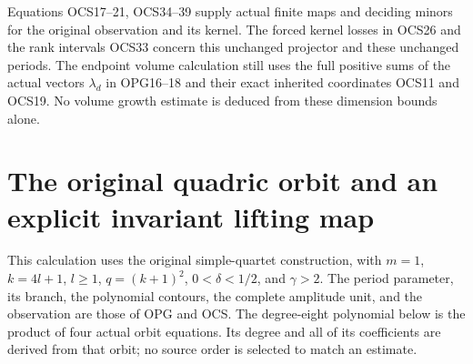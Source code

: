 \documentclass[11pt,a4paper]{article}
\begin{document}
Equations OCS17--21, OCS34--39 supply actual finite maps
and deciding minors for the original observation and its
kernel. The forced kernel losses in OCS26 and the rank
intervals OCS33 concern this unchanged projector and these
unchanged periods. The endpoint volume calculation still
uses the full positive sums of the actual vectors
$\lambda_d$ in OPG16--18 and their exact inherited
coordinates OCS11 and OCS19. No volume growth estimate
is deduced from these dimension bounds alone.


\clearpage
\section{The original quadric orbit and an explicit invariant lifting map}
\label{sec:OQC}

This calculation uses the original simple-quartet construction, with
$m=1$, $k=4l+1$, $l\geq1$, $q=(k+1)^2$, $0<\delta<1/2$, and
$\gamma>2$. The period parameter, its branch, the polynomial contours,
the complete amplitude unit, and the observation are those of OPG and
OCS. The degree-eight polynomial below is the product of four actual
orbit equations. Its degree and all of its coefficients are derived
from that orbit; no source order is selected to match an estimate.
\end{document}
